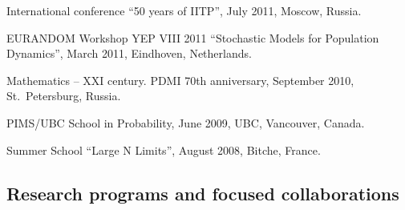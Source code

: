 \documentclass[letterpaper,11pt]{article}
\begin{document}
\begin{etaremune}
	\item
	      International conference ``50 years of IITP'', July 2011,
	      Moscow, Russia.

	\item
	      EURANDOM Workshop YEP VIII 2011 ``Stochastic Models for
	      Population Dynamics'', March 2011, Eindhoven, Netherlands.

	\item
	      Mathematics -- XXI century. PDMI 70th anniversary, September
	      2010, St.~Petersburg, Russia.

	\item
	      PIMS/UBC School in Probability, June 2009, UBC, Vancouver,
	      Canada.

	\item
	      Summer School ``Large N Limits'', August 2008, Bitche, France.
\end{etaremune}

\subsection*{Research programs and focused collaborations}
\end{document}
